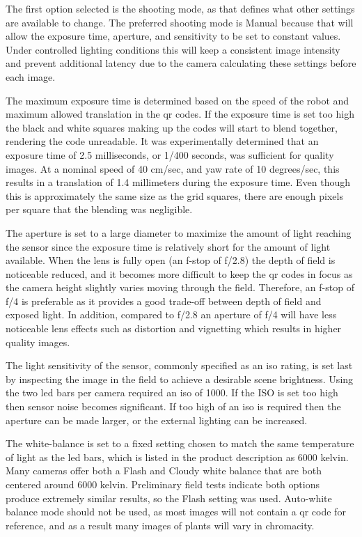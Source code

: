 The first option selected is the shooting mode, as that defines what other settings are available to change.  The preferred shooting mode is Manual because that will allow the exposure time, aperture, and sensitivity to be set to constant values.  Under controlled lighting conditions this will keep a consistent image intensity and prevent additional latency due to the camera calculating these settings before each image.

The maximum exposure time is determined based on the speed of the robot and maximum allowed translation in the \ac{qr} codes.  If the exposure time is set too high the black and white squares making up the codes will start to blend together, rendering the code unreadable.  It was experimentally determined that an exposure time of 2.5 milliseconds, or 1/400 seconds, was sufficient for quality images.  At a nominal speed of 40 cm/sec, and yaw rate of 10 degrees/sec, this results in a translation of 1.4 millimeters during the exposure time.  Even though this is approximately the same size as the grid squares, there are enough pixels per square that the blending was negligible. 

The aperture is set to a large diameter to maximize the amount of light reaching the sensor since the exposure time is relatively short for the amount of light available.  When the lens is fully open (an f-stop of f/2.8) the depth of field is noticeable reduced, and it becomes more difficult to keep the \ac{qr} codes in focus as the camera height slightly varies moving through the field.  Therefore, an f-stop of f/4 is preferable as it provides a good trade-off between depth of field and exposed light.  In addition, compared to f/2.8 an aperture of f/4 will have less noticeable lens effects such as distortion and vignetting which results in higher quality images.  

The light sensitivity of the sensor, commonly specified as an \ac{iso} rating, is set last by inspecting the image in the field to achieve a desirable scene brightness.  Using the two \ac{led} bars per camera required an \ac{iso} of 1000.  If the ISO is set too high then sensor noise becomes significant.  If too high of an \ac{iso} is required then the aperture can be made larger, or the external lighting can be increased.  

The white-balance is set to a fixed setting chosen to match the same temperature of light as the \ac{led} bars, which is listed in the product description as 6000 kelvin.  Many cameras offer both a Flash and Cloudy white balance that are both centered around 6000 kelvin.   Preliminary field tests indicate both options produce extremely similar results, so the Flash setting was used.  Auto-white balance mode should not be used, as most images will not contain a \ac{qr} code for reference, and as a result many images of plants will vary in chromacity. 


